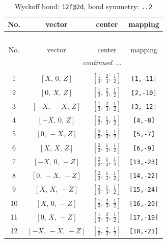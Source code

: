 \documentclass[fleqn,8pt]{jsarticle}
\begin{document}
\renewcommand{\arraystretch}{1.2}
\begin{longtable}{cccc}
\caption{Wyckoff bond: {\tt 12f@2d}, bond symmetry: {\tt ..2}}
 \\
 \hline \hline
No. & vector & center & mapping \\ \hline \endfirsthead

\multicolumn{3}{l}{\tablename\ \thetable{}} \\
 \hline \hline
No. & vector & center & mapping \\ \hline \endhead

 \hline \hline
\multicolumn{3}{r}{\footnotesize\it continued ...} \\ \endfoot

 \hline \hline
\multicolumn{3}{r}{} \\ \endlastfoot

1 & $\left[ X,\, 0,\, Z \right]$ & $\left[ \frac{1}{3},\, \frac{2}{3},\, \frac{1}{2} \right]$ & {\tt [1,-11]} \\ \hline
2 & $\left[ 0,\, X,\, Z \right]$ & $\left[ \frac{1}{3},\, \frac{2}{3},\, \frac{1}{2} \right]$ & {\tt [2,-10]} \\ \hline
3 & $\left[ - X,\, - X,\, Z \right]$ & $\left[ \frac{1}{3},\, \frac{2}{3},\, \frac{1}{2} \right]$ & {\tt [3,-12]} \\ \hline
4 & $\left[ - X,\, 0,\, Z \right]$ & $\left[ \frac{2}{3},\, \frac{1}{3},\, \frac{1}{2} \right]$ & {\tt [4,-8]} \\ \hline
5 & $\left[ 0,\, - X,\, Z \right]$ & $\left[ \frac{2}{3},\, \frac{1}{3},\, \frac{1}{2} \right]$ & {\tt [5,-7]} \\ \hline
6 & $\left[ X,\, X,\, Z \right]$ & $\left[ \frac{2}{3},\, \frac{1}{3},\, \frac{1}{2} \right]$ & {\tt [6,-9]} \\ \hline
7 & $\left[ - X,\, 0,\, - Z \right]$ & $\left[ \frac{2}{3},\, \frac{1}{3},\, \frac{1}{2} \right]$ & {\tt [13,-23]} \\ \hline
8 & $\left[ 0,\, - X,\, - Z \right]$ & $\left[ \frac{2}{3},\, \frac{1}{3},\, \frac{1}{2} \right]$ & {\tt [14,-22]} \\ \hline
9 & $\left[ X,\, X,\, - Z \right]$ & $\left[ \frac{2}{3},\, \frac{1}{3},\, \frac{1}{2} \right]$ & {\tt [15,-24]} \\ \hline
10 & $\left[ X,\, 0,\, - Z \right]$ & $\left[ \frac{1}{3},\, \frac{2}{3},\, \frac{1}{2} \right]$ & {\tt [16,-20]} \\ \hline
11 & $\left[ 0,\, X,\, - Z \right]$ & $\left[ \frac{1}{3},\, \frac{2}{3},\, \frac{1}{2} \right]$ & {\tt [17,-19]} \\ \hline
12 & $\left[ - X,\, - X,\, - Z \right]$ & $\left[ \frac{1}{3},\, \frac{2}{3},\, \frac{1}{2} \right]$ & {\tt [18,-21]} \\
\end{longtable}
\end{document}
